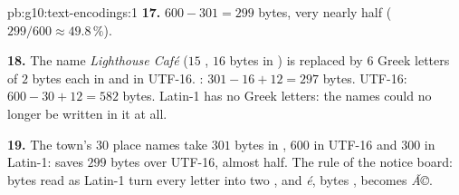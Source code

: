 \begin{solution}{pb:g10:text-encodings:1}
\textbf{17.} $600 - 301 = 299$ bytes, very nearly half ($299/600 \approx 49.8\,\%$).

\textbf{18.} The name \textit{Lighthouse Café} ($15$ , $16$ bytes in ) is replaced by $6$ Greek letters
of $2$ bytes each in  and in UTF-16. : $301 - 16 + 12 = 297$ bytes. UTF-16: $600 - 30 + 12 = 582$ bytes.
Latin-1 has no Greek letters: the names could no longer be written in it at all.

\textbf{19.} The town's $30$ place names take $301$ bytes in , $600$ in UTF-16 and $300$ in Latin-1: 
saves $299$ bytes over UTF-16, almost half. The rule of the notice board:  bytes read as Latin-1 turn every
 letter into two , and \textit{é}, bytes , becomes \textit{Ã©}.
\end{solution}
